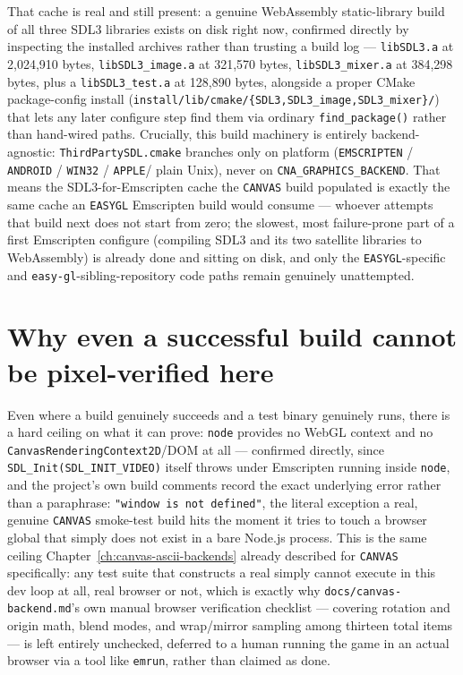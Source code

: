 That cache is real and still present: a genuine WebAssembly static-library build of all three
SDL3 libraries exists on disk right now, confirmed directly by inspecting the installed
archives rather than trusting a build log --- \texttt{libSDL3.a} at 2{,}024{,}910 bytes,
\texttt{libSDL3\_image.a} at 321{,}570 bytes, \texttt{libSDL3\_mixer.a} at 384{,}298 bytes, plus
a \texttt{libSDL3\_test.a} at 128{,}890 bytes, alongside a proper CMake package-config
install (\texttt{install/lib/cmake/\{SDL3,SDL3\_image,SDL3\_mixer\}/}) that lets any later
configure step find them via ordinary \texttt{find\_package()} rather than hand-wired paths.
Crucially, this build machinery is entirely backend-agnostic: \texttt{ThirdPartySDL.cmake}
branches only on platform (\texttt{EMSCRIPTEN} / \texttt{ANDROID} / \texttt{WIN32} / \texttt{APPLE}/
plain Unix), never on \texttt{CNA\_GRAPHICS\_BACKEND}. That means the SDL3-for-Emscripten cache
the \texttt{CANVAS} build populated is exactly the same cache an \texttt{EASYGL} Emscripten
build would consume --- whoever attempts that build next does not start from zero; the
slowest, most failure-prone part of a first Emscripten configure (compiling SDL3 and its two
satellite libraries to WebAssembly) is already done and sitting on disk, and only the
\texttt{EASYGL}-specific and \texttt{easy-gl}-sibling-repository code paths remain genuinely
unattempted.

\section{Why even a successful build cannot be pixel-verified here}

Even where a build genuinely succeeds and a test binary genuinely runs, there is a hard
ceiling on what it can prove: \texttt{node} provides no WebGL context and no
\texttt{CanvasRenderingContext2D}/DOM at all --- confirmed directly, since
\texttt{SDL\_Init(SDL\_INIT\_VIDEO)} itself throws under Emscripten running inside
\texttt{node}, and the project's own build comments record the exact underlying error rather
than a paraphrase: \texttt{"window is not defined"}, the literal exception a real, genuine
\texttt{CANVAS} smoke-test build hits the moment it tries to touch a browser global that
simply does not exist in a bare Node.js process. This is the same ceiling Chapter~\ref{ch:canvas-ascii-backends} already
described for \texttt{CANVAS} specifically: any test suite that constructs a real
 simply cannot execute in this dev loop at all, real browser or not,
which is exactly why \texttt{docs/canvas-backend.md}'s own manual browser verification
checklist --- covering rotation and origin math, blend modes, and wrap/mirror sampling among
thirteen total items --- is left entirely unchecked, deferred to a human running the game in
an actual browser via a tool like \texttt{emrun}, rather than claimed as done.

